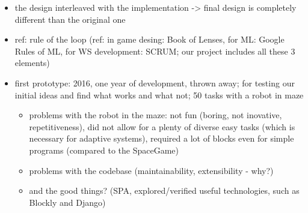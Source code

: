 \begin{itemize}
\item the design interleaved with the implementation -> final design is completely different than the original one
\item ref: rule of the loop (ref: in game desing: Book of Lenses, for ML: Google Rules of ML, for WS development: SCRUM; our project includes all these 3 elements)
\item first prototype: 2016, one year of development, thrown away; for testing our initial ideas and find what works and what not; 50 tasks with a robot in maze
  \begin{itemize}
  \item problems with the robot in the maze: not fun (boring, not inovative, repetitiveness), did not allow for a plenty of diverse easy tasks (which is necessary for adaptive systems), required a lot of blocks even for simple programs (compared to the SpaceGame)
  \item problems with the codebase (maintainability, extensibility - why?)
  \item and the good things? (SPA, explored/verified useful technologies, such as Blockly and Django)
  \end{itemize}
\end{itemize}

